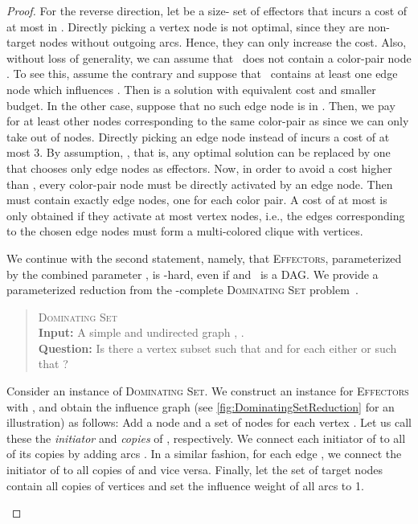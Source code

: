 \documentclass{article}
\newcommand{\probDef}[3]{
  \begin{quote}
    #1 \\
    \textbf{Input:} #2 \\
    \textbf{Question:} #3
  \end{quote}
}
\newcommand{\probDominatingSet}{\textsc{Dominating Set}\xspace}
\newcommand{\probEffectors}{\textsc{Effectors}\xspace}
\begin{document}
\begin{proof}
  For the reverse direction, let  be a size- set of effectors
  that incurs a cost of at most  in . Directly picking a vertex
  node is not optimal, since they are non-target nodes without outgoing arcs.
  Hence, they can only increase the cost.
  Also, without loss of generality, we can assume that~ does not contain a color-pair node .
  To see this, assume the contrary and
  suppose that~ contains at least one edge node which 
  influences . Then  is a solution with equivalent cost
  and smaller budget. In the other case, suppose that no such edge node is in .   
  Then, we pay for at least  other nodes corresponding to the
  same color-pair as  since we can only take  out of
   nodes. Directly picking an edge node instead of  incurs a cost of at most 3.
  By assumption, , that is, any optimal solution
  can be replaced by one that chooses only edge nodes as effectors.
  Now, in order to avoid a cost higher than , 
  every color-pair node must be directly activated by an edge node.
  Then  must contain exactly  edge nodes, one for each color pair. A cost of at most  is only obtained if they activate at most  vertex nodes, i.e., the edges corresponding to the chosen edge nodes must form
  a multi-colored clique with  vertices.

  We continue with the second statement,
  namely, that \probEffectors, parameterized by the combined parameter ,
  is -hard, even if  and~ is a DAG.
  We provide a parameterized reduction from the -complete
  \probDominatingSet problem~\cite{DF13}.
  \probDef
    {\probDominatingSet}
    {A simple and undirected graph , .}
    {Is there a vertex subset  such that  and for each  either  or  such that ?}
  Consider an instance  of \probDominatingSet. We construct an instance for \probEffectors with , and obtain the influence graph (see \autoref{fig:DominatingSetReduction} for an illustration) as follows:
  Add a node  and a set of nodes  for each vertex . Let us call these the \emph{initiator} and \emph{copies} of , respectively. We connect each initiator of  to all of its copies by adding arcs . In a similar fashion, for each edge , we connect the initiator of  to all copies of  and vice versa. Finally, let the set of target nodes  contain all copies of vertices and set the influence weight of all arcs to 1.
  
  \begin{figure}[t]
  \centering
\end{figure}
\end{proof}
\end{document}
